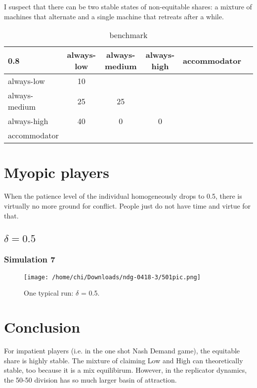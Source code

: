 \documentclass[12.5pt]{report}
\begin{document}
I suspect that there can be two stable states of non-equitable shares: a mixture of machines that alternate and a single machine that retreats after a while.


\begin{table}[h!]
\center
\begin{tabular}{l|ccccc}
\textbf{0.8}& always-low & always-medium & always-high & accommodator\\
\hline
always-low    & 10 &     &    &   \\
always-medium & 25 & 25 &    & \\
always-high   & 40 &  0  & 0  & \\
accommodator  &     &     &  & \\
\end{tabular}
\caption{benchmark}
\end{table}




\section{Myopic players}
When the patience level of the individual homogeneously drops to 0.5, there is virtually no more ground for conflict. People just do not have time and virtue for that.

\subsection{$\delta = 0.5$}

\subsubsection{Simulation 7}

\begin{figure}
\center
\texttt{[image: /home/chi/Downloads/ndg-0418-3/501pic.png]}
\caption{One typical run: $\delta$ = 0.5.}
\end{figure}

\section{Conclusion}

For impatient players (i.e. in the one shot Nash Demand game), the equitable share is highly stable. The mixture of claiming Low and High can theoretically stable, too because it is a mix equilibirum. However, in the replicator dynamics, the 50-50 division has so much larger basin of attraction. \\
\end{document}
